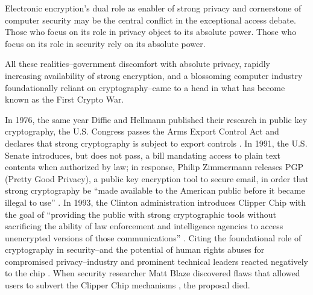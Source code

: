 

Electronic encryption's dual role as enabler of strong privacy and cornerstone of computer security may be the central
conflict in the exceptional access debate. Those who focus on its role in privacy object to its absolute power. Those
who focus on its role in security rely on its absolute power.


All these realities--government discomfort with absolute privacy, rapidly increasing availability of strong encryption,
and a blossoming computer industry foundationally reliant on cryptography--came to a head in what has become known as
the First Crypto War.

In 1976, the same year Diffie and Hellmann published their research in public key cryptography, the U.S. Congress passes
the Arms Export Control Act and declares that strong cryptography is subject to export controls \cite{kehl_right_2015}.
In 1991, the U.S. Senate introduces, but does not pass, a bill mandating access to plain text contents when authorized
by law; in response, Philip Zimmermann releases PGP (Pretty Good Privacy), a public key encryption tool to secure email,
in order that strong cryptography be ``made available to the American public before it became illegal to use''
\cite{zimmermann_1996}. In 1993, the Clinton administration introduces Clipper Chip with the goal of ``providing the
public with strong cryptographic tools without sacrificing the ability of law enforcement and intelligence agencies to
access unencrypted versions of those communications'' \cite{thompson_2015}. Citing the foundational role of cryptography
in security--and the potential of human rights abuses for compromised privacy--industry and prominent technical leaders
reacted negatively to the chip \cite{kehl_right_2015} \cite{zimmermann_1996}. When security researcher Matt Blaze
discovered flaws that allowed users to subvert the Clipper Chip mechanisms \cite{blaze_protocol_1994}, the proposal
died.

